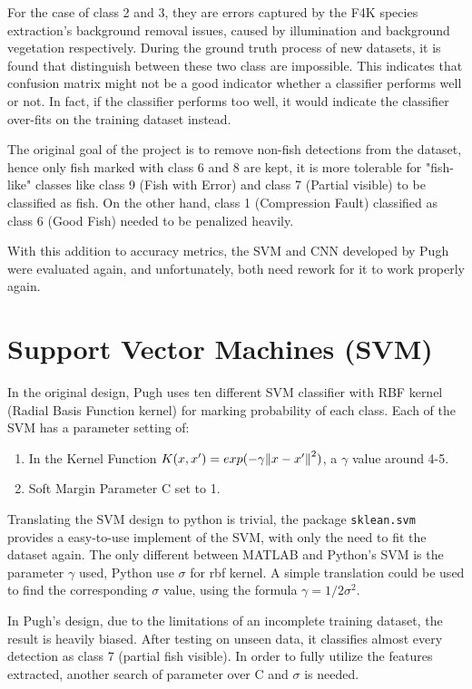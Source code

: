 \documentclass[bsc,logo,twoside,fullspacing,parskip]{infthesis}
\begin{document}
For the case of class 2 and 3, they are errors captured by the F4K species extraction's background removal issues, caused by illumination and background vegetation respectively.
During the ground truth process of new datasets, it is found that distinguish between these two class are impossible.
This indicates that confusion matrix might not be a good indicator whether a classifier performs well or not. In fact, if the classifier performs too well, it would indicate the classifier over-fits on the training dataset instead.

The original goal of the project is to remove non-fish detections from the dataset, hence only fish marked with class 6 and 8 are kept, it is more tolerable for "fish-like" classes 
like class 9 (Fish with Error) and class 7 (Partial visible) to be classified as fish.
On the other hand, class 1 (Compression Fault) classified as class 6 (Good Fish) needed to be penalized heavily. 

With this addition to accuracy metrics, the SVM and CNN developed by Pugh were evaluated again, and unfortunately, both need rework for it to work properly again.

\section{Support Vector Machines (SVM)}

In the original design, Pugh uses ten different SVM classifier with RBF kernel (Radial Basis Function kernel) for marking probability of each class. Each of the SVM has a parameter setting of:
\renewcommand{\labelenumi}{\arabic{enumi}}
\begin{enumerate}
	\item In the Kernel Function \(K(x,x') = exp(-\gamma\norm{x-x'}^2)\), a \(\gamma\) value around 4-5.
	\item Soft Margin Parameter C set to 1.
\end{enumerate}
Translating the SVM design to python is trivial, the package {\tt sklean.svm} provides a easy-to-use implement of the SVM, with only the need to fit the dataset again.
The only different between MATLAB and Python's SVM is the parameter \(\gamma\) used, Python use \(\sigma\) for rbf kernel. A simple translation could be used to find the corresponding \(\sigma\) value, using the formula \( \gamma = 1/2\sigma^2 \).

In Pugh's design, due to the limitations of an incomplete training dataset, the result is heavily biased. After testing on unseen data, it classifies almost every detection as class 7 (partial fish visible). In order to fully utilize the features extracted, another search of parameter over C and \(\sigma\) is needed.
\end{document}
